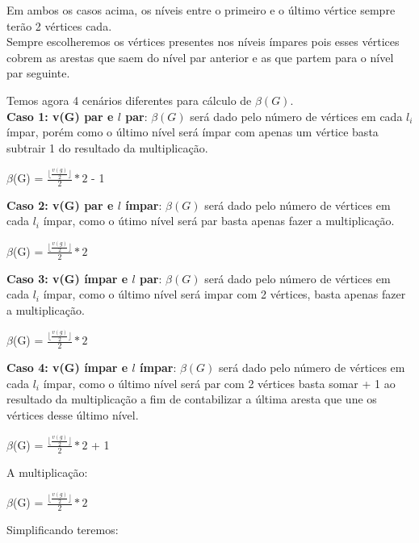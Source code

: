 \documentclass[12pt]{article}
\begin{document}
Em ambos os casos acima, os níveis entre o primeiro e o último vértice sempre terão 2 vértices cada. \\

Sempre escolheremos os vértices presentes nos níveis ímpares pois esses vértices cobrem as arestas que saem do nível par anterior e as que partem para o nível par seguinte.


Temos agora 4 cenários diferentes para cálculo de $\beta(G)$. \\

\textbf{Caso 1: v(G) par e $l$ par}: $\beta(G)$ será dado pelo número de vértices em cada $l_i$ ímpar, porém como o último nível será ímpar com apenas um vértice basta subtrair 1 do resultado da multiplicação.
\begin{center}
    $\beta$(G) = $\frac{\lfloor\frac{v(g)}{2}\rfloor}{2} * {2}$ - 1 
\end{center}

\textbf{Caso 2: v(G) par e $l$ ímpar}: $\beta(G)$ será dado pelo número de vértices em cada $l_i$ ímpar, como o útimo nível será par basta apenas fazer a multiplicação.
\begin{center}
    $\beta$(G) = $\frac{\lfloor\frac{v(g)}{2}\rfloor}{2} * {2}$ 
\end{center}

\textbf{Caso 3: v(G) ímpar e $l$ par}: $\beta(G)$ será dado pelo número de vértices em cada $l_i$ ímpar, como o último nível será impar com 2 vértices, basta apenas fazer a multiplicação.
\begin{center}
    $\beta$(G) = $\frac{\lfloor\frac{v(g)}{2}\rfloor}{2} * {2}$ 
\end{center}

\textbf{Caso 4: v(G) ímpar e $l$ ímpar}: $\beta(G)$ será dado pelo número de vértices em cada $l_i$ ímpar, como o último nível será par com 2 vértices basta somar + 1 ao resultado da multiplicação a fim de contabilizar a última aresta que une os vértices desse último nível. \\ 
\begin{center}
    $\beta$(G) = $\frac{\lfloor\frac{v(g)}{2}\rfloor}{2} * {2}$ + 1
\end{center}

A multiplicação:



\begin{center}
    $\beta$(G) = $\frac{\lfloor\frac{v(g)}{2}\rfloor}{2} * {2}$
\end{center}
Simplificando teremos:
\end{document}

